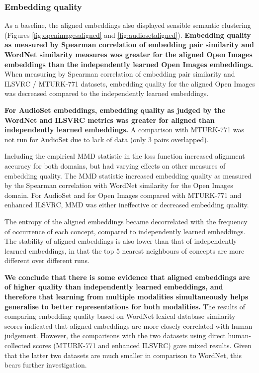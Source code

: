 \newpage
\subsubsection{Embedding quality}
As a baseline, the aligned embeddings also displayed sensible semantic clustering (Figures \ref{fig:openimagesaligned} and \ref{fig:audiosetaligned}). \textbf{Embedding quality as measured by Spearman correlation of embedding pair similarity and WordNet similarity measures was greater for the aligned Open Images embeddings than the independently learned Open Images embeddings.} When measuring by Spearman correlation of embedding pair similarity and ILSVRC / MTURK-771 datasets, embedding quality for the aligned Open Images was decreased compared to the independently learned embeddings.     

\textbf{For AudioSet embeddings, embedding quality as judged by the WordNet and ILSVRC metrics was greater for aligned than independently learned embeddings.} A comparison with MTURK-771 was not run for AudioSet due to lack of data (only 3 pairs overlapped).  

Including the empirical MMD statistic in the loss function increased alignment accuracy for both domains, but had varying effects on other measures of embedding quality. The MMD statistic increased embedding quality as measured by the Spearman correlation with WordNet similarity for the Open Images domain. For AudioSet and for Open Images compared with MTURK-771 and enhanced ILSVRC, MMD was either ineffective or decreased embedding quality. 

The entropy of the aligned embeddings became decorrelated with the frequency of occurrence of each concept, compared to independently learned embeddings. The stability of aligned embeddings is also lower than that of independently learned embeddings, in that the top 5 nearest neighbours of concepts are more different over different runs.

\textbf{We conclude that there is some evidence that aligned embeddings are of higher quality than independently learned embeddings, and therefore that learning from multiple modalities simultaneously helps generalise to better representations for both modalities.} The results of comparing embedding quality based on WordNet lexical database similarity scores indicated that aligned embeddings are more closely correlated with human judgement. However, the comparisons with the two datasets using direct human-collected scores (MTURK-771 and enhanced ILSVRC) gave mixed results. Given that the latter two datasets are much smaller in comparison to WordNet, this bears further investigation. 

